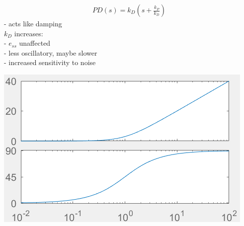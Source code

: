         \begin{minipage}{0.49\linewidth}
            \begin{align*}
                PD(s) = k_D (s + \frac{k_P}{k_D})
            \end{align*}
            - acts like damping\\
            $k_D$ increases:\\
            - $e_{ss}$ unaffected\\
            - less oscillatory, maybe slower\\
            - increased sensitivity to noise\\
        \end{minipage}
        \begin{minipage}{0.49\linewidth}
            \includegraphics[width = \linewidth]{src/images/PD-controller.png}
        \end{minipage}
    
